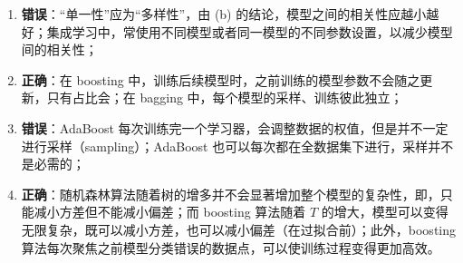 \documentclass{ctexart}
\begin{document}
\begin{enumerate}
\def\labelenumi{\arabic{enumi}.}

\item
  \textbf{错误}：``单一性''应为``多样性''，由 (b)
  的结论，模型之间的相关性应越小越好；集成学习中，常使用不同模型或者同一模型的不同参数设置，以减少模型间的相关性；
\item
  \textbf{正确}：在 boosting
  中，训练后续模型时，之前训练的模型参数不会随之更新，只有占比会；在
  bagging 中，每个模型的采样、训练彼此独立；
\item
  \textbf{错误}：AdaBoost
  每次训练完一个学习器，会调整数据的权值，但是并不一定进行采样（sampling）；AdaBoost
  也可以每次都在全数据集下进行，采样并不是必需的；
\item
  \textbf{正确}：随机森林算法随着树的增多并不会显著增加整个模型的复杂性，即，只能减小方差但不能减小偏差；而
  boosting 算法随着 \(T\)
  的增大，模型可以变得无限复杂，既可以减小方差，也可以减小偏差（在过拟合前）；此外，boosting
  算法每次聚焦之前模型分类错误的数据点，可以使训练过程变得更加高效。
\end{enumerate}
\end{document}
